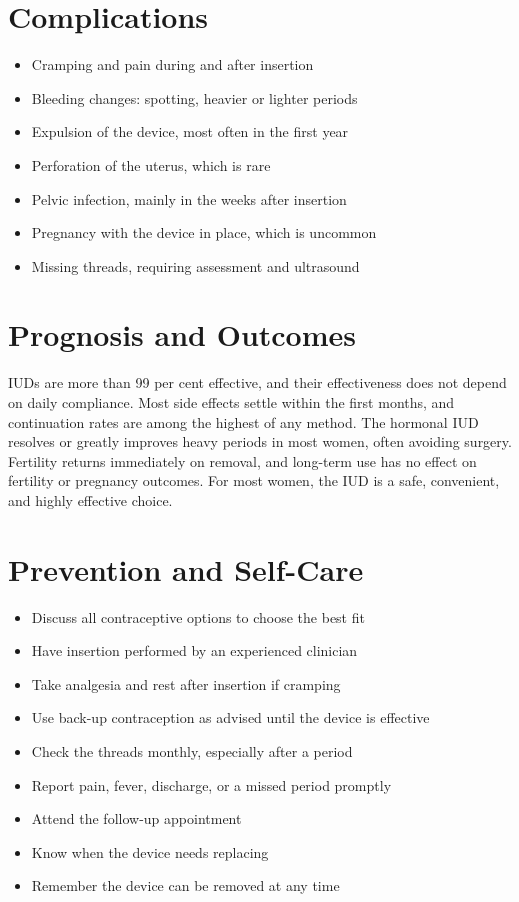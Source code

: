 \section*{Complications}
\begin{itemize}
    \item Cramping and pain during and after insertion
    \item Bleeding changes: spotting, heavier or lighter periods
    \item Expulsion of the device, most often in the first year
    \item Perforation of the uterus, which is rare
    \item Pelvic infection, mainly in the weeks after insertion
    \item Pregnancy with the device in place, which is uncommon
    \item Missing threads, requiring assessment and ultrasound
\end{itemize}

\section*{Prognosis and Outcomes}
IUDs are more than 99 per cent effective, and their effectiveness does not depend on daily compliance. Most side effects settle within the first months, and continuation rates are among the highest of any method. The hormonal IUD resolves or greatly improves heavy periods in most women, often avoiding surgery. Fertility returns immediately on removal, and long-term use has no effect on fertility or pregnancy outcomes. For most women, the IUD is a safe, convenient, and highly effective choice.

\section*{Prevention and Self-Care}
\begin{itemize}
    \item Discuss all contraceptive options to choose the best fit
    \item Have insertion performed by an experienced clinician
    \item Take analgesia and rest after insertion if cramping
    \item Use back-up contraception as advised until the device is effective
    \item Check the threads monthly, especially after a period
    \item Report pain, fever, discharge, or a missed period promptly
    \item Attend the follow-up appointment
    \item Know when the device needs replacing
    \item Remember the device can be removed at any time
\end{itemize}

